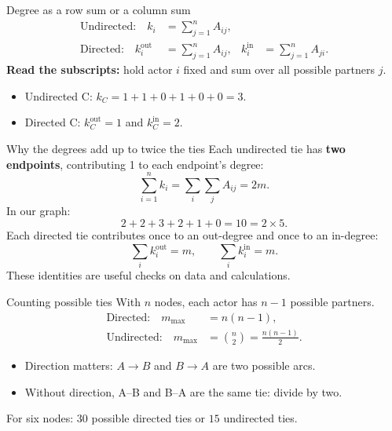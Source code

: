 \documentclass[aspectratio=169,11pt]{beamer}
\begin{document}
\begin{frame}{Degree as a row sum or a column sum}
\begin{align*}
\text{Undirected:}\quad k_i&=\sum_{j=1}^{n} A_{ij},\\[.5ex]
\text{Directed:}\quad k_i^{\mathrm{out}}&=\sum_{j=1}^{n} A_{ij},
&k_i^{\mathrm{in}}&=\sum_{j=1}^{n} A_{ji}.
\end{align*}
\textbf{Read the subscripts:} hold actor $i$ fixed and sum over all possible partners $j$.
\medskip
\begin{itemize}
\item Undirected C: $k_C=1+1+0+1+0+0=3$.
\item Directed C: $k_C^{\mathrm{out}}=1$ and $k_C^{\mathrm{in}}=2$.
\end{itemize}
\end{frame}

\begin{frame}{Why the degrees add up to twice the ties}
Each undirected tie has \textbf{two endpoints}, contributing 1 to each endpoint's degree:
\[\sum_{i=1}^{n}k_i=\sum_i\sum_j A_{ij}=2m.\]
In our graph:
\[2+2+3+2+1+0=10=2\times5.\]
Each directed tie contributes once to an out-degree and once to an in-degree:
\[\sum_i k_i^{\mathrm{out}}=m,\qquad\sum_i k_i^{\mathrm{in}}=m.\]
\textcolor{accent}{These identities are useful checks on data and calculations.}
\end{frame}

\begin{frame}{Counting possible ties}
With $n$ nodes, each actor has $n-1$ possible partners.
\begin{align*}
\text{Directed:}\quad m_{\max}&=n(n-1),\\[1ex]
\text{Undirected:}\quad m_{\max}&=\binom{n}{2}=\frac{n(n-1)}{2}.
\end{align*}
\begin{itemize}
\item Direction matters: $A\to B$ and $B\to A$ are two possible arcs.
\medskip
\item Without direction, A--B and B--A are the same tie: divide by two.
\end{itemize}
\medskip
For six nodes: $30$ possible directed ties or $15$ undirected ties.
\end{frame}
\end{document}
